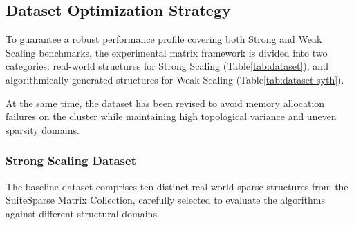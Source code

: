 \documentclass[conference]{IEEEtran}
\begin{document}
\subsection{Dataset Optimization Strategy}
To guarantee a robust performance profile covering both Strong and Weak Scaling benchmarks, the experimental matrix framework is divided into two categories: real-world structures for Strong Scaling (Table\ref{tab:dataset}), and algorithmically generated structures for Weak Scaling (Table\ref{tab:dataset-syth}).

At the same time, the dataset has been revised to avoid memory allocation failures on the cluster while maintaining high topological variance and uneven sparsity domains.

\subsubsection{Strong Scaling Dataset}
The baseline dataset comprises ten distinct real-world sparse structures from the SuiteSparse Matrix Collection, carefully selected to evaluate the algorithms against different structural domains.
\end{document}
